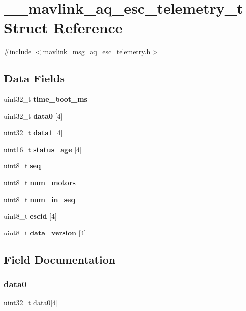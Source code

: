 \section{\+\_\+\+\_\+mavlink\+\_\+aq\+\_\+esc\+\_\+telemetry\+\_\+t Struct Reference}
\label{struct____mavlink__aq__esc__telemetry__t}


{\ttfamily \#include $<$mavlink\+\_\+msg\+\_\+aq\+\_\+esc\+\_\+telemetry.\+h$>$}

\subsection*{Data Fields}
\begin{DoxyCompactItemize}
\item 
uint32\+\_\+t \textbf{ time\+\_\+boot\+\_\+ms}
\item 
uint32\+\_\+t \textbf{ data0} [4]
\item 
uint32\+\_\+t \textbf{ data1} [4]
\item 
uint16\+\_\+t \textbf{ status\+\_\+age} [4]
\item 
uint8\+\_\+t \textbf{ seq}
\item 
uint8\+\_\+t \textbf{ num\+\_\+motors}
\item 
uint8\+\_\+t \textbf{ num\+\_\+in\+\_\+seq}
\item 
uint8\+\_\+t \textbf{ escid} [4]
\item 
uint8\+\_\+t \textbf{ data\+\_\+version} [4]
\end{DoxyCompactItemize}


\subsection{Field Documentation}
\mbox{\label{struct____mavlink__aq__esc__telemetry__t_ac0eb14138604e927dcc5fad77f9747dd}} 
\subsubsection{data0}
{\footnotesize\ttfamily uint32\+\_\+t data0[4]}

\mbox{\label{struct____mavlink__aq__esc__telemetry__t_ab352fac776d6d16a97426ae77b1a34ad}} 
